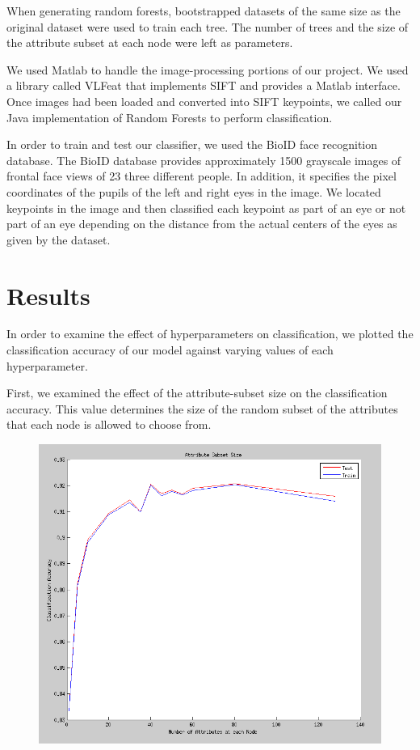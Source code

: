 \documentclass[11pt, twocolumn]{article}
\begin{document}
When generating random forests, bootstrapped datasets of the same size as the original dataset were
used to train each tree. The number of trees and the size of the attribute subset at each node were
left as parameters.

We used Matlab to handle the image-processing portions of our project. We used a library called
VLFeat that implements SIFT and provides a Matlab interface. Once images had been loaded and
converted into SIFT keypoints, we called our Java implementation of Random Forests to perform
classification.

In order to train and test our classifier, we used the BioID face recognition database. The BioID
database provides approximately 1500 grayscale images of frontal face views of 23 three different
people. In addition, it specifies the pixel coordinates of the pupils of the left and right eyes in
the image. We located keypoints in the image and then classified each keypoint as part of an eye or
not part of an eye depending on the distance from the actual centers of the eyes as given by the
dataset.

\section*{Results}
In order to examine the effect of hyperparameters on classification, we plotted the classification
accuracy of our model against varying values of each hyperparameter.

First, we examined the effect of the attribute-subset size on the classification accuracy. This
value determines the size of the random subset of the attributes that each node is allowed to choose
from.

\begin{figure}[h!]
    \centering
    \includegraphics[scale=0.3]{./imgs/attributes.png}
\end{figure}
\end{document}

